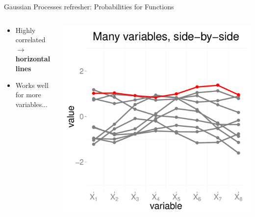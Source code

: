 \documentclass[final,t]{beamer}\usepackage[]{graphicx}\usepackage[]{color}
\makeatletter
\def\maxwidth{ %
  \ifdim\Gin@nat@width>\linewidth
    \linewidth
  \else
    \Gin@nat@width
  \fi
}
\newenvironment{knitrout}{}{} %
\makeatother
\begin{document}
\begin{frame}[fragile]
\begin{block}{Gaussian Processes refresher: Probabilities for Functions}
\begin{columns}[T]
\begin{column}{0.12\linewidth}
        \begin{itemize} \scriptsize
          \item Highly correlated $\rightarrow$ \textbf{horizontal lines}
          \item Works well for more variables...
        \end{itemize}
      \end{column}
      \begin{column}{0.12\linewidth}
\begin{knitrout}
\color{fgcolor}
\includegraphics[width=\maxwidth]{figure/many_side_by_side} 

\end{knitrout}


\end{column}
\end{columns}
\end{block}
\end{frame}
\end{document}
